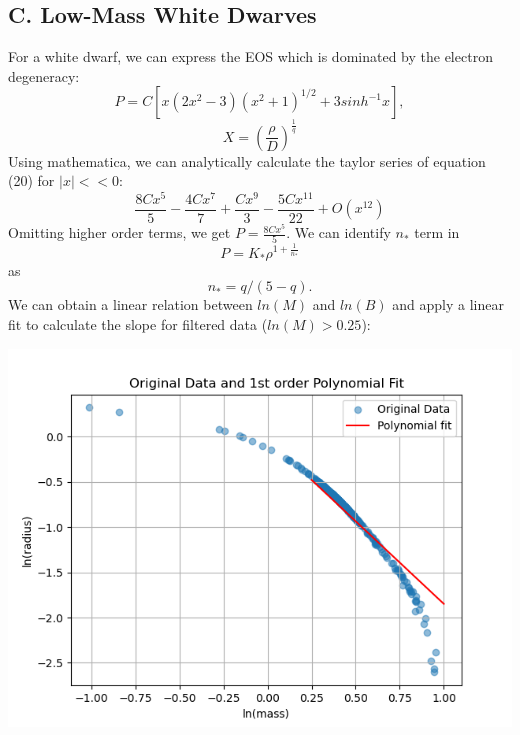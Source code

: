 \documentclass{article}
\begin{document}
\subsection*{C. Low-Mass White Dwarves}
For a white dwarf, we can express the EOS which is dominated by the electron degeneracy:
\begin{equation}
    P = C[x(2x^2-3)(x^2+1)^{1/2}+3sinh^{-1}x],
\end{equation}
\begin{equation}
    X = (\frac{\rho}{D})^{\frac{1}{q}}
\end{equation}
Using mathematica, we can analytically calculate the taylor series of equation (20) for $|x|<<0$:
\begin{equation}
    \frac{8 C x^5}{5}-\frac{4 C x^7}{7}+\frac{C x^9}{3}-\frac{5 C x^{11}}{22}+O\left(x^{12}\right)
\end{equation}
Omitting higher order terms, we get $P = \frac{8 C x^5}{5}$. We can identify $n_*$ term in \begin{equation}
    P=K_*\rho^{1+\frac{1}{n_*}}
\end{equation}
as
\begin{equation}
    n_* = q/(5-q).
\end{equation}
We can obtain a linear relation between $ln(M)$ and $ln(B)$ and apply a linear fit to calculate the slope for filtered data ($ln(M) > 0.25$):
\begin{center}
    \includegraphics[scale=0.65]{images_newton/2_Polyfit.png}
\end{center}
\end{document}
